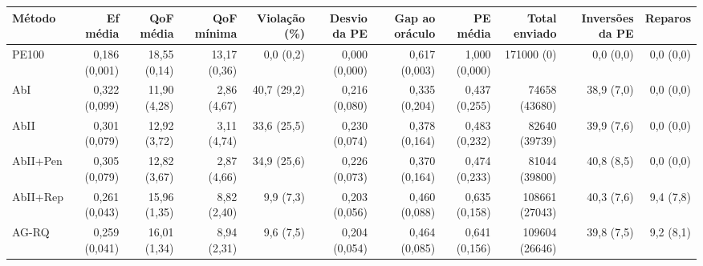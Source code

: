 \begin{tabular}{lrrrrrrrrrr}
\toprule
Método & Ef média & QoF média & QoF mínima & Violação (\%) & Desvio da PE & Gap ao oráculo & PE média & Total enviado & Inversões da PE & Reparos \\
\midrule
PE100 & 0{,}186 (0{,}001) & 18{,}55 (0{,}14) & 13{,}17 (0{,}36) & 0{,}0 (0{,}2) & 0{,}000 (0{,}000) & 0{,}617 (0{,}003) & 1{,}000 (0{,}000) & 171000 (0) & 0{,}0 (0{,}0) & 0{,}0 (0{,}0) \\
AbI & 0{,}322 (0{,}099) & 11{,}90 (4{,}28) & 2{,}86 (4{,}67) & 40{,}7 (29{,}2) & 0{,}216 (0{,}080) & 0{,}335 (0{,}204) & 0{,}437 (0{,}255) & 74658 (43680) & 38{,}9 (7{,}0) & 0{,}0 (0{,}0) \\
AbII & 0{,}301 (0{,}079) & 12{,}92 (3{,}72) & 3{,}11 (4{,}74) & 33{,}6 (25{,}5) & 0{,}230 (0{,}074) & 0{,}378 (0{,}164) & 0{,}483 (0{,}232) & 82640 (39739) & 39{,}9 (7{,}6) & 0{,}0 (0{,}0) \\
AbII+Pen & 0{,}305 (0{,}079) & 12{,}82 (3{,}67) & 2{,}87 (4{,}66) & 34{,}9 (25{,}6) & 0{,}226 (0{,}073) & 0{,}370 (0{,}164) & 0{,}474 (0{,}233) & 81044 (39800) & 40{,}8 (8{,}5) & 0{,}0 (0{,}0) \\
AbII+Rep & 0{,}261 (0{,}043) & 15{,}96 (1{,}35) & 8{,}82 (2{,}40) & 9{,}9 (7{,}3) & 0{,}203 (0{,}056) & 0{,}460 (0{,}088) & 0{,}635 (0{,}158) & 108661 (27043) & 40{,}3 (7{,}6) & 9{,}4 (7{,}8) \\
AG-RQ & 0{,}259 (0{,}041) & 16{,}01 (1{,}34) & 8{,}94 (2{,}31) & 9{,}6 (7{,}5) & 0{,}204 (0{,}054) & 0{,}464 (0{,}085) & 0{,}641 (0{,}156) & 109604 (26646) & 39{,}8 (7{,}5) & 9{,}2 (8{,}1) \\
\bottomrule
\end{tabular}
